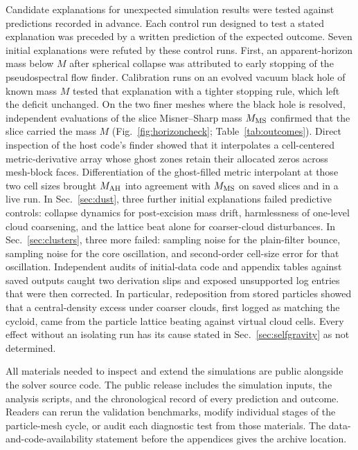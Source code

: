Candidate explanations for unexpected simulation results were tested against predictions recorded in advance. Each control run designed to test a stated explanation was preceded by a written prediction of the expected outcome. Seven initial explanations were refuted by these control runs. First, an apparent-horizon mass below $M$ after spherical collapse was attributed to early stopping of the pseudospectral flow finder. Calibration runs on an evolved vacuum black hole of known mass $M$ tested that explanation with a tighter stopping rule, which left the deficit unchanged. On the two finer meshes where the black hole is resolved, independent evaluations of the slice Misner--Sharp mass $M_{\rm MS}$ confirmed that the slice carried the mass $M$ (Fig.~\ref{fig:horizoncheck}; Table~\ref{tab:outcomes}). Direct inspection of the host code's finder showed that it interpolates a cell-centered metric-derivative array whose ghost zones retain their allocated zeros across mesh-block faces. Differentiation of the ghost-filled metric interpolant at those two cell sizes brought $M_{\rm AH}$ into agreement with $M_{\rm MS}$ on saved slices and in a live run. In Sec.~\ref{sec:dust}, three further initial explanations failed predictive controls: collapse dynamics for post-excision mass drift, harmlessness of one-level cloud coarsening, and the lattice beat alone for coarser-cloud disturbances. In Sec.~\ref{sec:clusters}, three more failed: sampling noise for the plain-filter bounce, sampling noise for the core oscillation, and second-order cell-size error for that oscillation. Independent audits of initial-data code and appendix tables against saved outputs caught two derivation slips and exposed unsupported log entries that were then corrected. In particular, redeposition from stored particles showed that a central-density excess under coarser clouds, first logged as matching the cycloid, came from the particle lattice beating against virtual cloud cells. Every effect without an isolating run has its cause stated in Sec.~\ref{sec:selfgravity} as not determined.

All materials needed to inspect and extend the simulations are public alongside the solver source code. The public release includes the simulation inputs, the analysis scripts, and the chronological record of every prediction and outcome. Readers can rerun the validation benchmarks, modify individual stages of the particle-mesh cycle, or audit each diagnostic test from those materials. The data-and-code-availability statement before the appendices gives the archive location.
